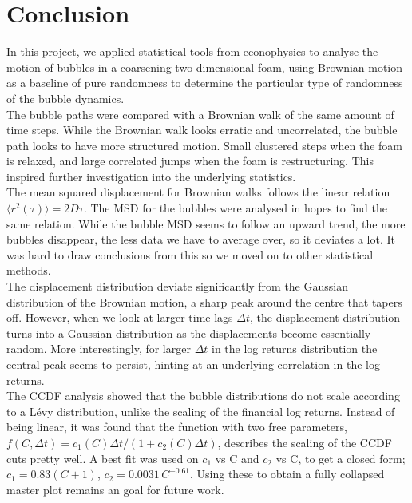 \section{Conclusion} \label{sec:conclusion}
In this project, we applied statistical tools from econophysics to analyse the motion of bubbles in a coarsening two-dimensional foam, using Brownian motion as a baseline of pure randomness to determine the particular type of randomness of the bubble dynamics.\\

The bubble paths were compared with a Brownian walk of the same amount of time steps. While the Brownian walk looks erratic and uncorrelated, the bubble path looks to have more structured motion. Small clustered steps when the foam is relaxed, and large correlated jumps when the foam is restructuring. This inspired further investigation into the underlying statistics.\\

The mean squared displacement for Brownian walks follows the linear relation $\langle r^2(\tau) \rangle = 2D\tau$. The MSD for the bubbles were analysed in hopes to find the same relation. While the bubble MSD seems to follow an upward trend, the more bubbles disappear, the less data we have to average over, so it deviates a lot. It was hard to draw conclusions from this so we moved on to other statistical methods.\\

The displacement distribution deviate significantly from the Gaussian distribution of the Brownian motion, a sharp peak around the centre that tapers off. However, when we look at larger time lags $\Delta t$, the displacement distribution turns into a Gaussian distribution as the displacements become essentially random. More interestingly, for larger $\Delta t$ in the log returns distribution the central peak seems to persist, hinting at an underlying correlation in the log returns.\\

The CCDF analysis showed that the bubble distributions do not scale according to a Lévy distribution, unlike the scaling of the financial log returns. Instead of being linear, it was found that the function with two free parameters, $f(C, \Delta t) = c_1(C) \Delta t / (1 + c_2(C)\Delta t)$, describes the scaling of the CCDF cuts pretty well. A best fit was used on $c_1$ vs C and $c_2$ vs C, to get a closed form; $c_1 = 0.83(C+1)$, $c_2 = 0.0031\,C^{-0.61}$. Using these to obtain a fully collapsed master plot remains an goal for future work.\\

